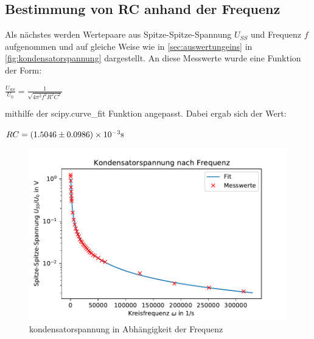 \subsection{Bestimmung von RC anhand der Frequenz}
\label{sec:auswertungzwei}
Als nächstes werden Wertepaare aus Spitze-Spitze-Spannung $U_{SS}$ und Frequenz $f$ aufgenommen und auf gleiche Weise 
wie in \autoref{sec:auswertungeins} in \autoref{fig:kondensatorspannung} dargestellt. An diese 
Messwerte wurde eine Funktion der Form:
\begin{center}
    $\frac{U_{SS}}{U_0}=\frac{1}{\sqrt{4\pi^2 f^2 R^2C^2}}$\\
\end{center}
mithilfe der scipy.curve_fit Funktion angepasst. Dabei ergab sich der Wert:
\begin{center}
    $RC=(1.5046 \pm 0.0986)\times 10^{-3}\si[]{s}$\\
\end{center}
\begin{figure}
    \centering
    \includegraphics{Kondensatorspannung.pdf}
    \caption{kondensatorspannung in Abhängigkeit der Frequenz}
    \label{fig:kondensatorspannung}
  \end{figure}

